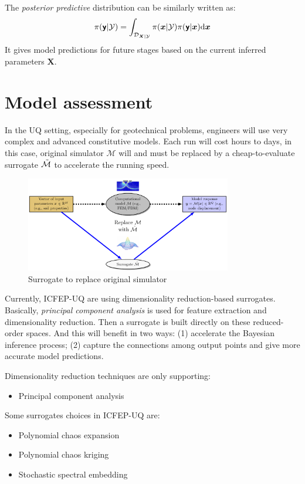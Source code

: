 \documentclass{ol-softwaremanual}
\begin{document}
The \textit{posterior predictive} distribution can be similarly written as:
\begin{equation}
    \label{eq: posterior predictive}
    \pi({\boldsymbol{\mathsf{y}}}|\mathcal{Y}) = \int_{\mathcal{D}_{\boldsymbol{X}|\mathcal{Y}}} 
    \pi(\boldsymbol{x}|\mathcal{Y}) \pi({\boldsymbol{\mathsf{y}}}|\boldsymbol{x}) {\rm{d}} \boldsymbol{x}
\end{equation}
It gives model predictions for future stages based on the current inferred parameters $\boldsymbol{X}$. 


\section{Model assessment}
In the UQ setting, especially for geotechnical problems, engineers will use very complex and advanced constitutive models. Each run will cost hours to days, in this case, original simulator $\mathcal{M}$ will and must be replaced by a cheap-to-evaluate surrogate $\Tilde{\mathcal{M}}$ to accelerate the running speed.
\begin{figure}[htbp]
    \centering
    \includegraphics[width = 90mm]{figures/figure-UQ_surrogate.pdf}
    \caption{Surrogate to replace original simulator}
    \label{fig:UQ_surrogate}
\end{figure}

Currently, ICFEP-UQ are using dimensionality reduction-based surrogates. Basically, \textit{principal component analysis} is used for feature extraction and dimensionality reduction. Then a surrogate is built directly on these reduced-order spaces. And this will benefit in two ways: (1) accelerate the Bayesian inference process; (2) capture the connections among output points and give more accurate model predictions. 

Dimensionality reduction techniques are only supporting:
\begin{itemize}
    \item Principal component analysis
\end{itemize}

Some surrogates choices in ICFEP-UQ are:
\begin{itemize}
    \item Polynomial chaos expansion
    \item Polynomial chaos kriging
    \item Stochastic spectral embedding
\end{itemize}
\end{document}
